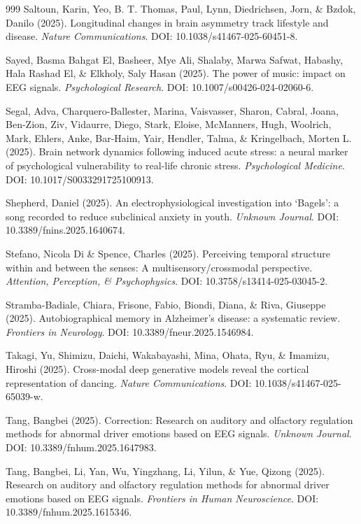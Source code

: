 \documentclass[9pt,onecolumn]{article}
\begin{document}
\begin{thebibliography}{999}
Saltoun, Karin, Yeo, B. T. Thomas, Paul, Lynn, Diedrichsen, Jorn, \& Bzdok, Danilo (2025). Longitudinal changes in brain asymmetry track lifestyle and disease. \textit{Nature Communications}. DOI: 10.1038/s41467-025-60451-8.

Sayed, Basma Bahgat El, Basheer, Mye Ali, Shalaby, Marwa Safwat, Habashy, Hala Rashad El, \& Elkholy, Saly Hasan (2025). The power of music: impact on EEG signals. \textit{Psychological Research}. DOI: 10.1007/s00426-024-02060-6.

Segal, Adva, Charquero-Ballester, Marina, Vaisvasser, Sharon, Cabral, Joana, Ben-Zion, Ziv, Vidaurre, Diego, Stark, Eloise, McManners, Hugh, Woolrich, Mark, Ehlers, Anke, Bar-Haim, Yair, Hendler, Talma, \& Kringelbach, Morten L. (2025). Brain network dynamics following induced acute stress: a neural marker of psychological vulnerability to real-life chronic stress. \textit{Psychological Medicine}. DOI: 10.1017/S0033291725100913.

Shepherd, Daniel (2025). An electrophysiological investigation into ‘Bagels’: a song recorded to reduce subclinical anxiety in youth. \textit{Unknown Journal}. DOI: 10.3389/fnins.2025.1640674.

Stefano, Nicola Di \& Spence, Charles (2025). Perceiving temporal structure within and between the senses: A multisensory/crossmodal perspective. \textit{Attention, Perception, \& Psychophysics}. DOI: 10.3758/s13414-025-03045-2.

Stramba-Badiale, Chiara, Frisone, Fabio, Biondi, Diana, \& Riva, Giuseppe (2025). Autobiographical memory in Alzheimer's disease: a systematic review. \textit{Frontiers in Neurology}. DOI: 10.3389/fneur.2025.1546984.

Takagi, Yu, Shimizu, Daichi, Wakabayashi, Mina, Ohata, Ryu, \& Imamizu, Hiroshi (2025). Cross-modal deep generative models reveal the cortical representation of dancing. \textit{Nature Communications}. DOI: 10.1038/s41467-025-65039-w.

Tang, Bangbei (2025). Correction: Research on auditory and olfactory regulation methods for abnormal driver emotions based on EEG signals. \textit{Unknown Journal}. DOI: 10.3389/fnhum.2025.1647983.

Tang, Bangbei, Li, Yan, Wu, Yingzhang, Li, Yilun, \& Yue, Qizong (2025). Research on auditory and olfactory regulation methods for abnormal driver emotions based on EEG signals. \textit{Frontiers in Human Neuroscience}. DOI: 10.3389/fnhum.2025.1615346.


\end{thebibliography}
\end{document}
